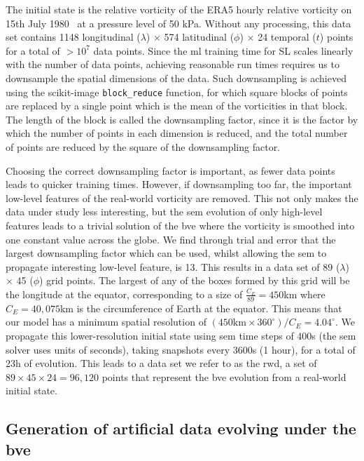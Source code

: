 \documentclass[aps,pra,a4paper,twocolumn,longbibliography,groupedaddress]{revtex4-2}
\begin{document}
The initial state is the relative vorticity of the ERA5 hourly relative vorticity on 15th July 1980~\cite{hersbach2018era5} at a pressure level of 50 kPa. Without any processing, this data set contains 1148 longitudinal ($\lambda$) $\times$ 574 latitudinal ($\phi$) $\times$ 24 temporal ($t$) points for a total of $>10^7$ data points. Since the \gls{ml} training time for SL scales linearly with the number of data points, achieving reasonable run times requires us to downsample the spatial dimensions of the data. Such downsampling is achieved using the scikit-image \texttt{block\_reduce} function, for which square blocks of points are replaced by a single point which is the mean of the vorticities in that block. The length of the block is called the downsampling factor, since it is the factor by which the number of points in each dimension is reduced, and the total number of points are reduced by the square of the downsampling factor. 

Choosing the correct downsampling factor is important, as fewer data points leads to quicker training times. However, if downsampling too far, the important low-level features of the real-world vorticity are removed. This not only makes the data under study less interesting, but the \gls{sem} evolution of only high-level features leads to a trivial solution of the \gls{bve} where the vorticity is smoothed into one constant value across the globe. We find through trial and error that the largest downsampling factor which can be used, whilst allowing the \gls{sem} to propagate interesting low-level feature, is 13. This results in a data set of 89 ($\lambda$) $\times$ 45 ($\phi$) grid points. The largest of any of the boxes formed by this grid will be the longitude at the equator, corresponding to a size of $\frac{C_E}{89} = 450$km where $C_E = 40,075$km is the circumference of Earth at the equator. This means that our model has a minimum spatial resolution of $(450\text{km} \times 360^\circ) / C_E = 4.04^\circ$. We propagate this lower-resolution initial state using \gls{sem} time steps of 400s (the \gls{sem} solver uses units of seconds), taking snapshots every 3600s (1 hour), for a total of 23h of evolution. This leads to a data set we refer to as the \gls{rwd}, a set of $89 \times 45 \times 24=96{,}120$ points that represent the \gls{bve} evolution from a real-world initial state.

\subsection{Generation of artificial data evolving under the \gls{bve}}\label{app:artificial_data}
\end{document}

